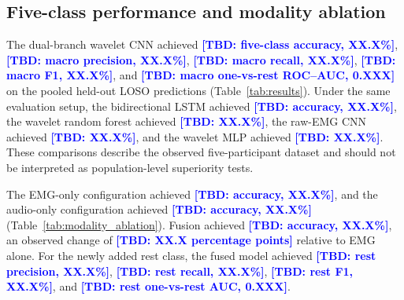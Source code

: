 \documentclass[pdflatex,sn-nature,iicol]{sn-jnl}
\newcommand{\TBD}[1]{\textcolor{blue}{\textbf{[TBD: #1]}}}
\begin{document}
\subsection{Five-class performance and modality ablation}

The dual-branch wavelet CNN achieved \TBD{five-class accuracy, XX.X\%}, \TBD{macro precision, XX.X\%}, \TBD{macro recall, XX.X\%}, \TBD{macro F1, XX.X\%}, and \TBD{macro one-vs-rest ROC--AUC, 0.XXX} on the pooled held-out LOSO predictions (Table~\ref{tab:results}). Under the same evaluation setup, the bidirectional LSTM achieved \TBD{accuracy, XX.X\%}, the wavelet random forest achieved \TBD{XX.X\%}, the raw-EMG CNN achieved \TBD{XX.X\%}, and the wavelet MLP achieved \TBD{XX.X\%}. These comparisons describe the observed five-participant dataset and should not be interpreted as population-level superiority tests.

The EMG-only configuration achieved \TBD{accuracy, XX.X\%}, and the audio-only configuration achieved \TBD{accuracy, XX.X\%} (Table~\ref{tab:modality_ablation}). Fusion achieved \TBD{accuracy, XX.X\%}, an observed change of \TBD{XX.X percentage points} relative to EMG alone. For the newly added rest class, the fused model achieved \TBD{rest precision, XX.X\%}, \TBD{rest recall, XX.X\%}, \TBD{rest F1, XX.X\%}, and \TBD{rest one-vs-rest AUC, 0.XXX}.
\end{document}
